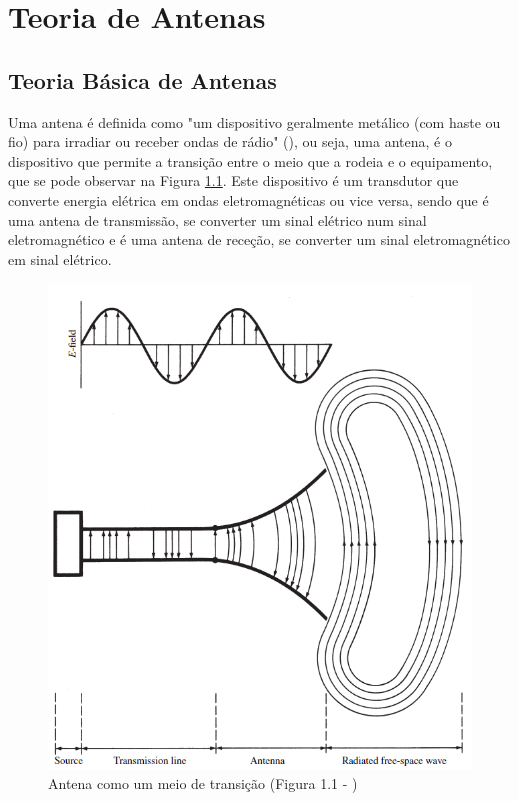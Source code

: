 
\chapter{Teoria de Antenas} %
\label{chap:Chapter3} %

\section{Teoria Básica de Antenas}
Uma antena é definida como "um dispositivo geralmente metálico (com haste ou fio) para irradiar ou receber ondas de rádio" (\cite{IEEE1983}), ou seja, uma antena, é o dispositivo que permite a transição entre o meio que a rodeia e o equipamento, que se pode observar na Figura \ref{fig:antena transicao}. 
Este dispositivo é um transdutor que converte energia elétrica em ondas eletromagnéticas ou vice versa, sendo que é uma antena de transmissão, se converter um sinal elétrico num sinal eletromagnético e é uma antena de receção, se converter um sinal eletromagnético em sinal elétrico. 

\begin{figure}[h]
\centering
\includegraphics[scale=0.6]{chapters/ch3/assets/Antenna_transicao}
\decoRule
\caption[Antena como meio de transição]{Antena como um meio de transição (Figura 1.1 - \cite{Balanis2016})}
\label{fig:antena transicao}
\end{figure}

